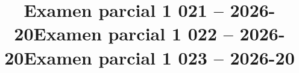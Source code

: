 \documentclass{exam}
\begin{document}
\cleartoeven
\setcounter{questioncounter}{0}
\setcounter{page}{1}
\title{Examen parcial 1 021 -- 2026-20}
\makeexamheader


\newpage
\programmingGrid
\newpage

\newpage

\newpage

\cleartoeven
\setcounter{questioncounter}{0}
\setcounter{page}{1}
\title{Examen parcial 1 022 -- 2026-20}
\makeexamheader


\newpage

\newpage
\programmingGrid
\newpage

\newpage

\cleartoeven
\setcounter{questioncounter}{0}
\setcounter{page}{1}
\title{Examen parcial 1 023 -- 2026-20}
\makeexamheader


\newpage

\newpage

\newpage
\programmingGrid
\newpage

\cleartoeven
{}
\end{document}
